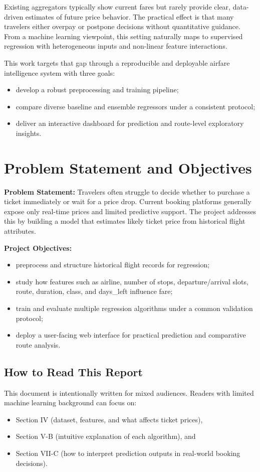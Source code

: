 \documentclass[conference]{IEEEtran}
\begin{document}
Existing aggregators typically show current fares but rarely provide clear, data-driven estimates of future price behavior. The practical effect is that many travelers either overpay or postpone decisions without quantitative guidance. From a machine learning viewpoint, this setting naturally maps to supervised regression with heterogeneous inputs and non-linear feature interactions.

This work targets that gap through a reproducible and deployable airfare intelligence system with three goals:
\begin{itemize}
\item develop a robust preprocessing and training pipeline;
\item compare diverse baseline and ensemble regressors under a consistent protocol;
\item deliver an interactive dashboard for prediction and route-level exploratory insights.
\end{itemize}

\section{Problem Statement and Objectives}
\textbf{Problem Statement:} Travelers often struggle to decide whether to purchase a ticket immediately or wait for a price drop. Current booking platforms generally expose only real-time prices and limited predictive support. The project addresses this by building a model that estimates likely ticket price from historical flight attributes.

\textbf{Project Objectives:}
\begin{itemize}
\item preprocess and structure historical flight records for regression;
\item study how features such as airline, number of stops, departure/arrival slots, route, duration, class, and days\_left influence fare;
\item train and evaluate multiple regression algorithms under a common validation protocol;
\item deploy a user-facing web interface for practical prediction and comparative route analysis.
\end{itemize}

\subsection{How to Read This Report}
This document is intentionally written for mixed audiences. Readers with limited machine learning background can focus on:
\begin{itemize}
\item Section IV (dataset, features, and what affects ticket prices),
\item Section V-B (intuitive explanation of each algorithm), and
\item Section VII-C (how to interpret prediction outputs in real-world booking decisions).
\end{itemize}
\end{document}
